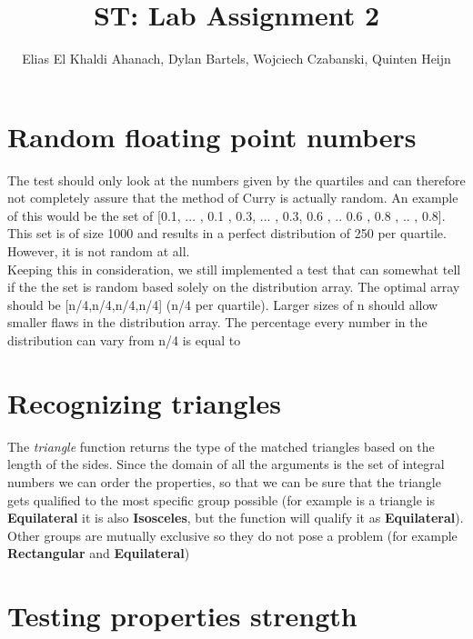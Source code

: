 \documentclass[a4paper]{article}
\title{ST: Lab Assignment 2}
\author{Elias El Khaldi Ahanach, Dylan Bartels, Wojciech Czabanski, Quinten Heijn}
\begin{document}
\maketitle

\section{Random floating point numbers}
The test should only look at the numbers given by the quartiles and can therefore not completely assure that the method of Curry is actually random. An example of this would be the set of [0.1, ... , 0.1 , 0.3, ... , 0.3, 0.6 , .. 0.6 , 0.8 , .. , 0.8]. This set is of size 1000 and results in a perfect distribution of 250 per quartile. However, it is not random at all.\\
Keeping this in consideration, we still implemented a test that can somewhat tell if the the set is random based solely on the distribution array. The optimal array should be [n/4,n/4,n/4,n/4] (n/4 per quartile). Larger sizes of n should allow smaller flaws in the distribution array. The percentage every number in the distribution can vary from n/4 is equal to     

\section{Recognizing triangles}

The \textit{triangle} function returns the type of the matched triangles based on the length of the sides. Since the domain of all the arguments is the set of integral numbers we can order the properties, so that we can be sure that the triangle gets qualified to the most specific group possible (for example is a triangle is \textbf{Equilateral} it is also \textbf{Isosceles}, but the function will qualify it as \textbf{Equilateral}). Other groups are mutually exclusive so they do not pose a problem (for example \textbf{Rectangular} and \textbf{Equilateral})

\section{Testing properties strength}
\end{document}
